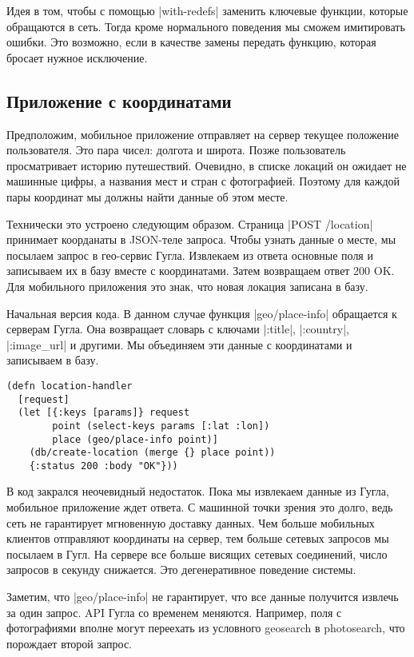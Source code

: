 {{{{{{{{Идея в том, чтобы с помощью \spverb|with-redefs| заменить ключевые функции, которые
обращаются в сеть. Тогда кроме нормального поведения мы сможем имитировать
ошибки. Это возможно, если в качестве замены передать функцию, которая бросает
нужное исключение.

\subsection{Приложение с координатами}

Предположим, мобильное приложение отправляет на сервер текущее положение
пользователя. Это пара чисел: долгота и широта. Позже пользователь просматривает
историю путешествий. Очевидно, в списке локаций он ожидает не машинные цифры, а
названия мест и стран с фотографией. Поэтому для каждой пары координат мы должны
найти данные об этом месте.

Технически это устроено следующим образом. Страница \spverb|POST /location| принимает
коорданаты в JSON-теле запроса. Чтобы узнать данные о месте, мы посылаем запрос
в гео-сервис Гугла. Извлекаем из ответа основные поля и записываем их в базу
вместе с координатами. Затем возвращаем ответ 200 OK. Для мобильного приложения
это знак, что новая локация записана в базу.

Начальная версия кода. В данном случае функция \spverb|geo/place-info| обращается к
серверам Гугла. Она возвращает словарь с ключами \spverb|:title|, \spverb|:country|,
\spverb|:image_url| и другими. Мы объединяем эти данные с координатами и записываем в
базу.

\begin{verbatim}
(defn location-handler
  [request]
  (let [{:keys [params]} request
        point (select-keys params [:lat :lon])
        place (geo/place-info point)]
    (db/create-location (merge {} place point))
    {:status 200 :body "OK"}))
\end{verbatim}

В код закрался неочевидный недостаток. Пока мы извлекаем данные из Гугла,
мобильное приложение ждет ответа. С машинной точки зрения это долго, ведь сеть
не гарантирует мгновенную доставку данных. Чем больше мобильных клиентов
отправляют координаты на сервер, тем больше сетевых запросов мы посылаем в
Гугл. На сервере все больше висящих сетевых соединений, число запросов в секунду
снижается. Это дегенеративное поведение системы.

Заметим, что \spverb|geo/place-info| не гарантирует, что все данные получится извлечь
за один запрос. API Гугла со временем меняются. Например, поля с фотографиями
вполне могут переехать из условного geosearch в photosearch, что порождает
второй запрос.

}}}}}}}}
